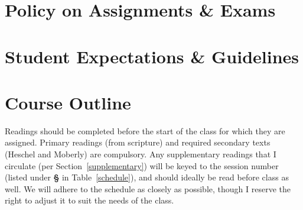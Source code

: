\documentclass[titlepage]{article}
\newcommand\policy{../policy}
\begin{document}


\section{Policy on Assignments \& Exams}
\label{policy}





\section{Student Expectations \& Guidelines}
\label{expectations}







\section{Course Outline}
\label{outline}

Readings should be completed before the start of the class for which they are
assigned. Primary readings (from scripture) and required secondary texts
(Heschel and Moberly) are compulsory. Any supplementary readings that I
circulate (per Section~\ref{supplementary}) will be keyed to the session
number (listed under \textbf{\S} in Table~\ref{schedule}), and should ideally
be read before class as well. We will adhere to the schedule as closely as
possible, though I reserve the right to adjust it to suit the needs of the
class.
\end{document}
